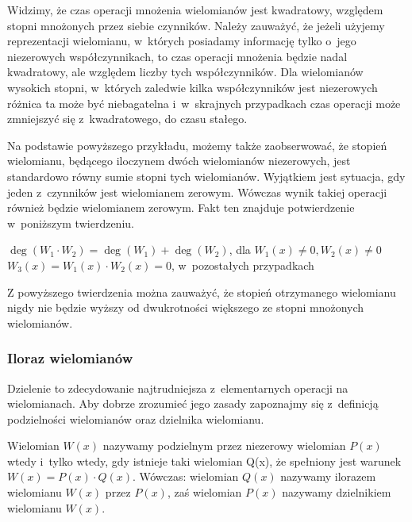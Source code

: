 Widzimy, że czas operacji mnożenia wielomianów jest kwadratowy, względem stopni mnożonych przez siebie czynników. Należy zauważyć, że jeżeli użyjemy reprezentacji wielomianu, w~których posiadamy informację tylko o~jego niezerowych współczynnikach, to czas operacji mnożenia będzie nadal kwadratowy, ale względem liczby tych współczynników. Dla wielomianów wysokich stopni, w~których zaledwie kilka współczynników jest niezerowych różnica ta może być niebagatelna i~w~skrajnych przypadkach czas operacji może zmniejszyć się z~kwadratowego, do czasu stałego.

Na podstawie powyższego przykładu, możemy także zaobserwować, że stopień wielomianu, będącego iloczynem dwóch wielomianów niezerowych, jest standardowo równy sumie stopni tych wielomianów. Wyjątkiem jest sytuacja, gdy jeden z~czynników jest wielomianem zerowym. Wówczas wynik takiej operacji również będzie wielomianem zerowym. Fakt ten znajduje potwierdzenie w~poniższym twierdzeniu.

\begin{theorem}
	$ $\\
	$\deg(W_1 \cdot W_2) = \deg(W_1) + \deg(W_2)$, dla $W_1(x) \neq 0, W_2(x) \neq 0$\\
	$W_3(x) = W_1(x) \cdot W_2(x) = 0$, w~pozostałych przypadkach
\end{theorem}

Z powyższego twierdzenia można zauważyć, że stopień otrzymanego wielomianu nigdy nie będzie wyższy od dwukrotności większego ze stopni mnożonych wielomianów.

\subsubsection{Iloraz wielomianów}

Dzielenie to zdecydowanie najtrudniejsza z~elementarnych operacji na wielomianach. Aby dobrze zrozumieć jego zasady zapoznajmy się z~definicją podzielności wielomianów oraz dzielnika wielomianu.

\begin{definition}
	$ $\\
	Wielomian $W(x)$ nazywamy podzielnym przez niezerowy wielomian $P(x)$ wtedy i~tylko wtedy, gdy istnieje taki wielomian Q(x), że spełniony jest warunek $W(x) = P(x) \cdot Q(x)$. Wówczas: wielomian $Q(x)$ nazywamy ilorazem wielomianu $W(x)$ przez $P(x)$, zaś wielomian $P(x)$ nazywamy dzielnikiem wielomianu $W(x)$.
\end{definition}

